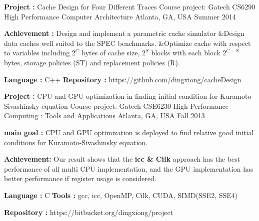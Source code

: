 \begin{cventries}
\cventry
{\textbf{Project :} Cache Design for Four Different Traces} 
{Course project: Gatech CS6290 High Performance Computer Architecture} 
{Atlanta, GA, USA} %
{Summer 2014} %
{
  \begin{cvitems}
  \item {\textbf{Achievement :} Design and implement a parametric cache
      simulator \quad\&\quad Design data caches well suited to the SPEC benchmarks. 
      \quad\&\quad Optimize cache with respect to variables
      including $2^C$ bytes of cache size, $2^S$ blocks with each block $2^{C-S}$ bytes,
      storage policies (ST) and replacement policies (R).
    }
  \item {\textbf{Language :} C++  \quad
      \textbf{Repository :} {\color{red} https://github.com/dingxiong/cacheDesign}
    }
  \end{cvitems}
}

\cventry
{\textbf{Project :} CPU and GPU optimization in finding initial 
  condition for Kuramoto Sivashinsky equation} 
{Course project: Gatech CSE6230 High Performance Computing : Tools and Applications} 
{Atlanta, GA, USA} %
{Fall 2013} %
{
  \begin{cvitems}
  \item {\textbf{main goal :} CPU and GPU optimization is deployed to find relative 
      good initial conditions for Kuramoto-Sivashinsky equation. 
    }
    \item {\textbf{Achievement: }Our result shows that the 
      \textbf{icc \& Cilk} approach has the best performance of all multi CPU implementation, and
      the GPU implementation has better performance if register usage is considered.
    }
  \item {\textbf{Language :} C \quad 
      \textbf{Tools : } gcc, icc, OpenMP, Cilk, CUDA, SIMD(SSE2, SSE4)
    }
  \item {
      \textbf{Repository :} {\color{red} https://bitbucket.org/dingxiong/project}
    }
  \end{cvitems}
}







\end{cventries}